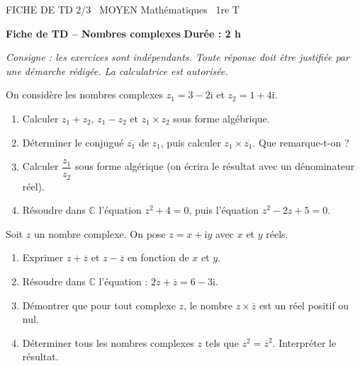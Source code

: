 \documentclass[11pt]{article}
\begin{document}
\begin{tcolorbox}[enhanced,colback=popink,colframe=popink,arc=10pt,boxrule=0pt,left=12pt,right=12pt,top=9pt,bottom=9pt]
{\color{white}\popxbold\small FICHE DE TD 2/3 \textbullet\ MOYEN \hfill Mathématiques \textbullet\ 1re T\par}
\end{tcolorbox}
\vspace{4pt}
\textbf{Fiche de TD -- Nombres complexes} \hfill \textbf{Durée : 2 h}

\emph{Consigne : les exercices sont indépendants. Toute réponse doit être justifiée par une démarche rédigée. La calculatrice est autorisée.}

\begin{exercice}
On considère les nombres complexes $z_1 = 3 - 2\mathrm{i}$ et $z_2 = 1 + 4\mathrm{i}$.
\begin{enumerate}
\item Calculer $z_1 + z_2$, $z_1 - z_2$ et $z_1 \times z_2$ sous forme algébrique.
\item Déterminer le conjugué $\overline{z_1}$ de $z_1$, puis calculer $z_1 \times \overline{z_1}$. Que remarque-t-on ?
\item Calculer $\dfrac{z_1}{z_2}$ sous forme algérique (on écrira le résultat avec un dénominateur réel).
\item Résoudre dans $\mathbb{C}$ l'équation $z^2 + 4 = 0$, puis l'équation $z^2 - 2z + 5 = 0$.
\end{enumerate}
\end{exercice}

\begin{exercice}
Soit $z$ un nombre complexe. On pose $z = x + \mathrm{i}y$ avec $x$ et $y$ réels.
\begin{enumerate}
\item Exprimer $z + \overline{z}$ et $z - \overline{z}$ en fonction de $x$ et $y$.
\item Résoudre dans $\mathbb{C}$ l'équation : $2z + \overline{z} = 6 - 3\mathrm{i}$.
\item Démontrer que pour tout complexe $z$, le nombre $z \times \overline{z}$ est un réel positif ou nul.
\item Déterminer tous les nombres complexes $z$ tels que $z^2 = \overline{z}^2$. Interpréter le résultat.
\end{enumerate}
\end{exercice}
\end{document}
